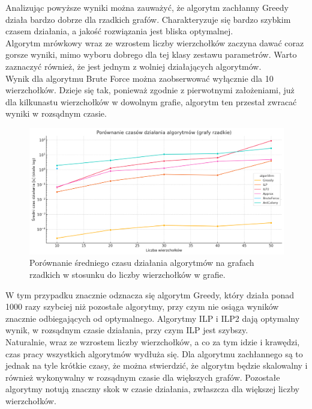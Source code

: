     Analizując powyższe wyniki można zauważyć, że algorytm zachłanny Greedy działa bardzo dobrze dla rzadkich grafów. Charakteryzuje się bardzo szybkim czasem działania, a jakość rozwiązania jest bliska optymalnej.\\
    Algorytm mrówkowy wraz ze wzrostem liczby wierzchołków zaczyna dawać coraz gorsze wyniki, mimo wyboru dobrego dla tej klasy zestawu parametrów. Warto zaznaczyć również, że jest jednym z wolniej działających algorytmów.\\
    Wynik dla algorytmu Brute Force można zaobserwować wyłącznie dla 10 wierzchołków. Dzieje się tak, ponieważ zgodnie z pierwotnymi założeniami, już dla kilkunastu wierzchołków w dowolnym grafie, algorytm ten przestał zwracać wyniki w rozsądnym czasie.

    \begin{figure}[H]
        \centering
        \includegraphics[width=\textwidth]{assets/sparse.png}
        \caption{Porównanie średniego czasu działania algorytmów na grafach rzadkich w stosunku do liczby wierzchołków w grafie.}
        \label{fig:sparsePlot}
    \end{figure}

    W tym przypadku znacznie odznacza się algorytm Greedy, który działa ponad 1000 razy szybciej niż pozostałe algorytmy, przy czym nie osiąga wyników znacznie odbiegających od optymalnego. Algorytmy ILP i ILP2 dają optymalny wynik, w rozsądnym czasie działania, przy czym ILP jest szybszy.\\
    Naturalnie, wraz ze wzrostem liczby wierzchołków, a co za tym idzie i krawędzi, czas pracy wszystkich algorytmów wydłuża się. Dla algorytmu zachłannego są to jednak na tyle krótkie czasy, że można stwierdzić, że algorytm będzie skalowalny i również wykonywalny w rozsądnym czasie dla większych grafów. Pozostałe algorytmy notują znaczny skok w czasie działania, zwłaszcza dla większej liczby wierzchołków.

